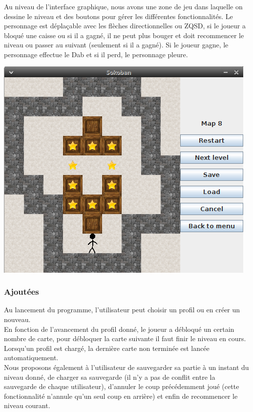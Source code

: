 \documentclass[a4paper,12pt]{article} %
\begin{document}
Au niveau de l'interface graphique, nous avons une zone de jeu dans laquelle on dessine le niveau et des boutons pour gérer les différentes fonctionnalités. Le personnage est déplaçable avec les flèches directionnelles ou ZQSD, si le joueur a bloqué une caisse ou si il a gagné, il ne peut plus bouger et doit recommencer le niveau ou passer au suivant (seulement si il a gagné). Si le joueur gagne, le personnage effectue le Dab et si il perd, le personnage pleure.

\begin{center}
\includegraphics[scale=0.5]{images/Capture2.png}
\end{center} 

\subsubsection*{Ajoutées}

Au lancement du programme, l'utilisateur peut choisir un profil ou en créer un nouveau.\\
En fonction de l'avancement du profil donné, le joueur a débloqué un certain nombre de carte, pour débloquer la carte suivante il faut finir le niveau en cours. Lorsqu'un profil est chargé, la dernière carte non terminée est lancée automatiquement.\\

Nous proposons également à l'utilisateur de sauvegarder sa partie à un instant du niveau donné, de charger sa sauvegarde (il n'y a pas de conflit entre la sauvegarde de chaque utilisateur), d'annuler le coup précédemment joué (cette fonctionnalité n'annule qu'un seul coup en arrière) et enfin de recommencer le niveau courant.
\end{document}
